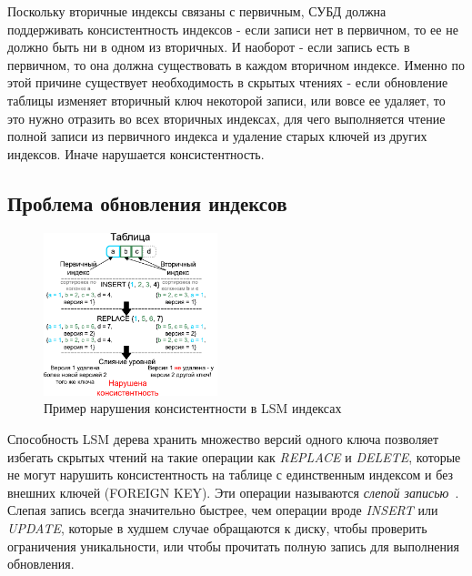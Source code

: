 \documentclass[a4paper,hidelinks,12pt]{article}
\begin{document}
Поскольку вторичные индексы связаны с первичным, СУБД должна поддерживать
консистентность индексов - если записи нет в первичном, то ее не должно быть ни
в одном из вторичных. И наоборот - если запись есть в первичном, то она должна
существовать в каждом вторичном индексе. Именно по этой причине существует
необходимость в скрытых чтениях - если обновление таблицы изменяет вторичный
ключ некоторой записи, или вовсе ее удаляет, то это нужно отразить во всех
вторичных индексах, для чего выполняется чтение полной записи из первичного
индекса и удаление старых ключей из других индексов. Иначе нарушается
консистентность.

\subsection{Проблема обновления индексов}

\begin{figure}[h]
\centering
\includegraphics[width=0.45\textwidth]{inconsistent_example}
\caption{Пример нарушения консистентности в LSM индексах}
\label{fig:inconsistent_example}
\end{figure}

Способность LSM дерева хранить множество версий одного ключа позволяет избегать
скрытых чтений на такие операции как \textit{REPLACE} и \textit{DELETE},
которые не могут нарушить консистентность на таблице с единственным индексом и
без внешних ключей (FOREIGN KEY). Эти операции называются
\textit {слепой записью}~\cite{slimdb}. Слепая запись всегда значительно
быстрее, чем операции вроде \textit{INSERT} или \textit{UPDATE}, которые в
худшем случае обращаются к диску, чтобы проверить ограничения уникальности, или
чтобы прочитать полную запись для выполнения обновления.
\end{document}
